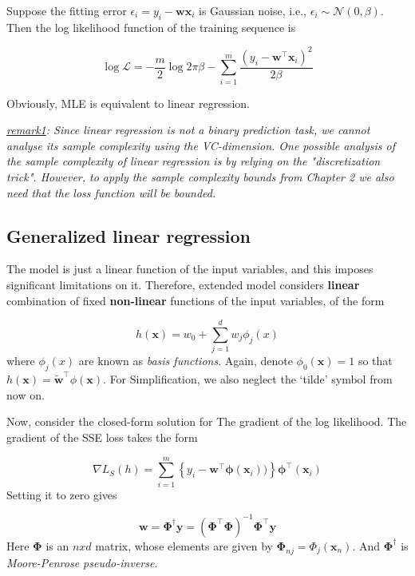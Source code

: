 \documentclass{article}
\begin{document}
	Suppose the fitting error $\epsilon_i = y_i-\mathbf{wx}_i$ is Gaussian noise, i.e., $\epsilon_i \sim\mathcal{N}(0,\beta)$. Then the log likelihood function of the training sequence is
	
	\begin{equation}
	\log \mathcal{L} = -\frac{m}{2} \log 2\pi\beta - \sum_{i=1}^m \frac{(y_i-\mathbf{w}^\top\mathbf{x}_i)^2}{2\beta}
	\end{equation}

	Obviously, MLE is equivalent to linear regression.

	\textit{\underline{remark1}: Since linear regression is not a binary prediction task, we cannot analyse its sample complexity using the VC-dimension. One possible analysis of the sample complexity of linear regression is by relying on the "discretization trick". However, to apply the sample complexity bounds from Chapter 2 we also need that the loss function will be bounded.}
	
	\subsection{Generalized linear regression}
	
	The model is just a linear function of the input variables, and this imposes significant limitations on it. Therefore, extended model considers \textbf{linear} combination of fixed \textbf{non-linear} functions of the input variables, of the form
	
	\begin{equation}
	h(\mathbf{x}) = w_0 + \sum_{j=1}^d w_j \phi_j(x)
	\end{equation}
where $\phi_j(x)$ are known as \textit{basis functions}. Again, denote $\phi_0(\mathbf{x})=1$ so that $h(\mathbf{x}) = \tilde{\mathbf{w}}^\top \phi(\mathbf{x})$. For Simplification, we also neglect the `tilde' symbol from now on.

	Now, consider the closed-form solution for The gradient of the log likelihood. The gradient of the SSE loss takes the form
	
	\begin{equation*}
	\nabla L_S(h) = \sum_{i=1}^m \left\{ y_i - \mathbf{w}^\top \mathbf{\phi} (\mathbf{x}_i)) \right\} \mathbf{\phi}^\top (\mathbf{x}_i)
	\end{equation*}
Setting it to zero gives 

	\begin{equation}
	\label{eqn:mp_solved}
	\mathbf{w} = \mathbf{\Phi}^\dag \mathbf{y} = (\mathbf{\Phi}^\top \mathbf{\Phi})^{-1}\mathbf{\Phi}^\top \mathbf{y}
	\end{equation}
Here $\mathbf{\Phi}$ is an $n x d$ matrix, whose elements are given by $\mathbf{\Phi}_{nj} = \Phi_j(\mathbf{x}_n)$. And $\mathbf{\Phi}^\dag$ is \textit{Moore-Penrose pseudo-inverse}.
\end{document}
